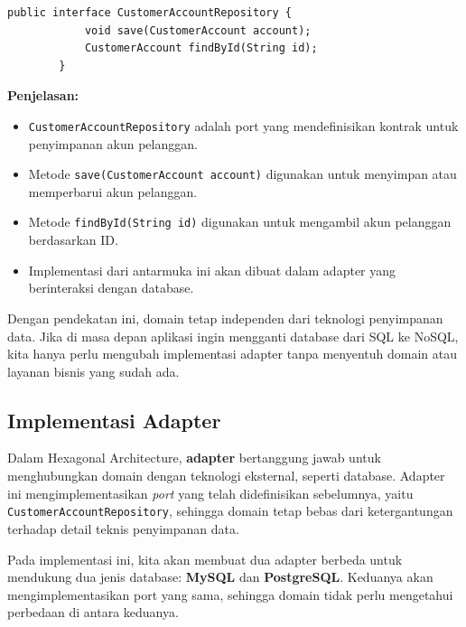 \begin{enumerate}
	\begin{lstlisting}[style=JavaStyle, caption=CustomerAccountRepository Port]
		public interface CustomerAccountRepository {
			void save(CustomerAccount account);
			CustomerAccount findById(String id);
		}
	\end{lstlisting}
	
	\textbf{Penjelasan:}
	\begin{itemize}
		\item \texttt{CustomerAccountRepository} adalah port yang mendefinisikan kontrak untuk penyimpanan akun pelanggan.
		\item Metode \texttt{save(CustomerAccount account)} digunakan untuk menyimpan atau memperbarui akun pelanggan.
		\item Metode \texttt{findById(String id)} digunakan untuk mengambil akun pelanggan berdasarkan ID.
		\item Implementasi dari antarmuka ini akan dibuat dalam adapter yang berinteraksi dengan database.
	\end{itemize}
\end{enumerate}

Dengan pendekatan ini, domain tetap independen dari teknologi penyimpanan data. Jika di masa depan aplikasi ingin mengganti database dari SQL ke NoSQL, kita hanya perlu mengubah implementasi adapter tanpa menyentuh domain atau layanan bisnis yang sudah ada.


\subsection{Implementasi Adapter}

Dalam Hexagonal Architecture, \textbf{adapter} bertanggung jawab untuk menghubungkan domain dengan teknologi eksternal, seperti database. Adapter ini mengimplementasikan \textit{port} yang telah didefinisikan sebelumnya, yaitu \texttt{CustomerAccountRepository}, sehingga domain tetap bebas dari ketergantungan terhadap detail teknis penyimpanan data.

Pada implementasi ini, kita akan membuat dua adapter berbeda untuk mendukung dua jenis database: \textbf{MySQL} dan \textbf{PostgreSQL}. Keduanya akan mengimplementasikan port yang sama, sehingga domain tidak perlu mengetahui perbedaan di antara keduanya.

